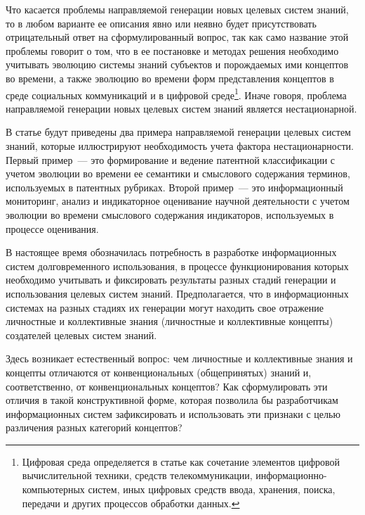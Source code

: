 \begin{multicols}{2}
   Что касается проблемы направляемой гене\-рации новых целевых систем знаний, то в
любом %
варианте ее описания явно или неявно будет присутствовать отрицательный ответ 
на сформулированный вопрос, так как само название этой проблемы говорит о том, 
что в ее постановке и методах %
реше\-ния необходимо учитывать эволюцию 
системы знаний субъектов и порождаемых ими концептов во времени, а также 
эволюцию во времени форм представления концептов в среде социальных 
коммуникаций и в цифровой среде\footnote{Цифровая среда определяется в статье 
как сочетание элементов цифровой вычислительной техники, средств 
телекоммуникации, информационно-компьютерных систем, иных цифровых средств 
ввода, хранения, поиска, передачи и других процессов обработки данных.}. Иначе 
говоря, проблема направляемой генерации новых целевых систем знаний является 
нестационарной.
{ %

}

   В статье будут приведены два примера  на\-прав\-ляемой генерации целевых систем знаний,
которые иллюстрируют необходимость учета фактора нестационарности. Первый пример~---
это формирование и ведение патентной классификации с учетом эволюции во времени ее
семантики и смыс\-ло\-во\-го содержания терминов, используемых в патентных рубриках.
Второй пример~--- это информационный мониторинг, анализ и индикаторное оценивание
научной деятельности с учетом эволюции во времени смыслового содержания индикаторов,
используемых в процессе оценивания.

   В настоящее время обозначилась потребность в разработке информационных систем
долговременного использования, в процессе функционирования которых необходимо
учитывать и фиксировать результаты разных стадий генерации и использования целевых
систем знаний. Предполагается, что в информационных системах на разных стадиях их
генерации могут находить свое отражение личностные и коллективные знания (личностные
и коллективные концепты) создателей целевых систем знаний.

   Здесь возникает естественный вопрос: чем личностные и коллективные знания и
концепты отличаются от конвенциональных (общепринятых) знаний и, соответственно, от
конвенциональных концептов? Как сформулировать эти отличия в такой конструктивной
форме, которая позволила бы разработчикам информационных систем зафиксировать и
использовать эти признаки с целью различения разных категорий концептов?


\end{multicols}
